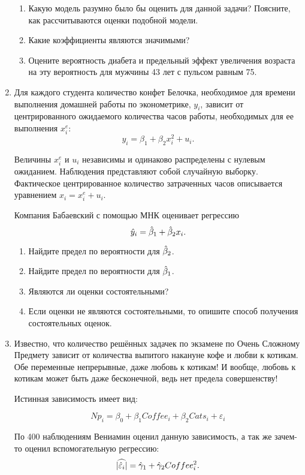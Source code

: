 \begin{enumerate}
\begin{enumerate}
  \item Какую модель разумно было бы оценить для данной задачи? Поясните, как рассчитываются оценки подобной модели. 
  \item Какие коэффициенты являются значимыми?
  \item Оцените вероятность диабета и предельный эффект увеличения возраста на эту вероятность для 
  мужчины 43 лет с пульсом равным 75. 
\end{enumerate}

\item Для каждого студента количество конфет Белочка, необходимое для времени выполнения домашней работы по эконометрике, 
$y_i$, зависит от центрированного ожидаемого количества часов работы, необходимых для ее выполнения $x_i^e$:
\[
y_i = \beta_1 + \beta_2 x_i^2 + u_i.  
\]

Величины $x_i^e$ и $u_i$ независимы и одинаково распределены с нулевым ожиданием. 
Наблюдения представляют собой случайную выборку. 
Фактическое центрированное количество затраченных часов описывается уравнением $x_i = x_i^e + u_i$.

Компания Бабаевский с помощью МНК оценивает регрессию
\[
\hat y_i = \hat{\beta}_1 + \hat{\beta}_2 x_i.  
\]

\begin{enumerate}
  \item Найдите предел по вероятности для $\hat{\beta}_2$.
\item Найдите предел по вероятности для $\hat{\beta}_1$.
\item Являются ли оценки состоятельными?
\item Если оценки не являются состоятельными, то опишите способ получения состоятельных оценок. 
\end{enumerate}

\item 
Известно, что количество решённых задачек по экзамене по 
Очень Сложному Предмету зависит от количества выпитого накануне кофе и любви к котикам.
Обе переменные непрерывные, даже любовь к котикам! 
И вообще, любовь к котикам может быть даже бесконечной, ведь нет предела совершенству! 

Истинная зависимость имеет вид:

\[ 
  Np_i = \beta_0 + \beta_1 Coffee_i + \beta_2 Cats_i + \varepsilon_i 
\]
  
По 400 наблюдениям Вениамин оценил данную зависимость, а так же зачем-то оценил вспомогательную регрессию:
\[
  \widehat{ \abs{\hat \varepsilon_i}} = \hat \gamma_1 + \hat \gamma_2 Coffee_i^2.
\]


\end{enumerate}
